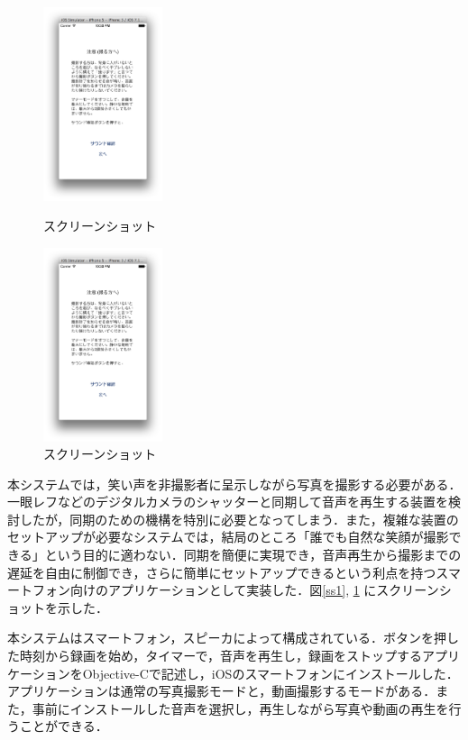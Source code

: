 \documentclass[submit,techreq]{ec2014}
\begin{document}
\begin{figure}[h]
\begin{minipage}{0.49\columnwidth}
\begin{center}
\includegraphics[width=35mm, bb=0 0 434 704]{images/ss/ss1.png}
\caption{スクリーンショット}
\label{ss1}
\end{center}
\end{minipage}
\begin{minipage}{0.49\columnwidth}
\begin{center}
\includegraphics[width=35mm, bb=0 0 434 704]{images/ss/ss1.png}
\caption{スクリーンショット}
\label{ss2}
\end{center}
\end{minipage}
\end{figure}

本システムでは，笑い声を非撮影者に呈示しながら写真を撮影する必要がある．一眼レフなどのデジタルカメラのシャッターと同期して音声を再生する装置を検討したが，同期のための機構を特別に必要となってしまう．また，複雑な装置のセットアップが必要なシステムでは，結局のところ「誰でも自然な笑顔が撮影できる」という目的に適わない．同期を簡便に実現でき，音声再生から撮影までの遅延を自由に制御でき，さらに簡単にセットアップできるという利点を持つスマートフォン向けのアプリケーションとして実装した．図\ref{ss1}, \ref{ss2} にスクリーンショットを示した．

本システムはスマートフォン，スピーカによって構成されている．ボタンを押した時刻から録画を始め，タイマーで，音声を再生し，録画をストップするアプリケーションをObjective-Cで記述し，iOSのスマートフォンにインストールした．アプリケーションは通常の写真撮影モードと，動画撮影するモードがある．また，事前にインストールした音声を選択し，再生しながら写真や動画の再生を行うことができる．
\end{document}
